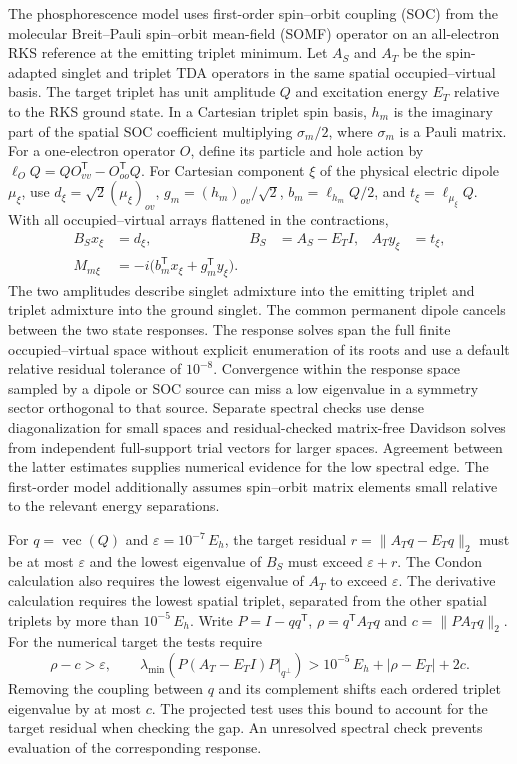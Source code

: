 The phosphorescence model uses first-order spin--orbit coupling (SOC)
from the molecular Breit--Pauli spin--orbit mean-field (SOMF) operator
on an all-electron RKS reference at the emitting triplet minimum.
\cite{somf,desouza-phosphorescence} Let $A_S$ and $A_T$ be the
spin-adapted singlet and triplet TDA operators in the same spatial
occupied--virtual basis. The target triplet has unit amplitude $Q$
and excitation energy $E_T$ relative to the RKS ground state. In a
Cartesian triplet spin basis, $h_m$ is the imaginary part of the
spatial SOC coefficient multiplying $\sigma_m/2$, where $\sigma_m$ is
a Pauli matrix.
For a one-electron operator $O$, define its particle and hole action
by $\ell_O Q=QO_{vv}^{\mathsf T}-O_{oo}^{\mathsf T}Q$. For
Cartesian component $\xi$ of the physical electric dipole $\mu_\xi$,
use $d_\xi=\sqrt{2}(\mu_\xi)_{ov}$, $g_m=(h_m)_{ov}/\sqrt{2}$,
$b_m=\ell_{h_m}Q/2$, and $t_\xi=\ell_{\mu_\xi}Q$.
With all occupied--virtual arrays flattened in the contractions,
\begin{align}
 B_S x_\xi &= d_\xi, & B_S &= A_S-E_T I, &
 A_T y_\xi &= t_\xi, \\
 M_{m\xi} &= -i\bigl(b_m^{\mathsf T}x_\xi+g_m^{\mathsf T}y_\xi\bigr).
 \label{eq:full-space-soc}
\end{align}
The two amplitudes describe singlet admixture into the emitting triplet
and triplet admixture into the ground singlet. The common permanent
dipole cancels between the two state responses. The response solves span
the full finite occupied--virtual space without explicit enumeration
of its roots and use a default relative residual tolerance of $10^{-8}$.
Convergence within the response space sampled by a dipole or SOC source
can miss a low eigenvalue in a symmetry sector orthogonal to that source.
Separate spectral checks use dense diagonalization for
small spaces and residual-checked matrix-free Davidson solves from
independent full-support trial vectors for larger spaces. Agreement
between the latter estimates supplies numerical evidence for the low
spectral edge. The first-order model additionally assumes spin--orbit
matrix elements small relative to the relevant energy separations.

For $q=\operatorname{vec}(Q)$ and $\varepsilon=10^{-7}\,E_h$, the target
residual $r=\|A_Tq-E_Tq\|_2$ must be at most $\varepsilon$ and the lowest
eigenvalue of $B_S$ must exceed $\varepsilon+r$. The Condon calculation
also requires the lowest eigenvalue of $A_T$ to exceed $\varepsilon$.
The derivative calculation requires the lowest spatial triplet,
separated from the other spatial triplets by more than $10^{-5}\,E_h$.
Write $P=I-qq^{\mathsf T}$, $\rho=q^{\mathsf T}A_Tq$ and
$c=\|PA_Tq\|_2$. For the numerical target the tests require
\begin{equation}
 \rho-c>\varepsilon,\qquad
 \lambda_{\min}\!\left(\left.P(A_T-E_T I)P\right|_{q^\perp}\right)
 >10^{-5}\,E_h+|\rho-E_T|+2c .
 \label{eq:soc-spectral-check}
\end{equation}
Removing the coupling between $q$ and its complement shifts each
ordered triplet eigenvalue by at most $c$. The projected test uses
this bound to account for the target residual when checking the gap.
An unresolved spectral check prevents evaluation of the corresponding
response.


